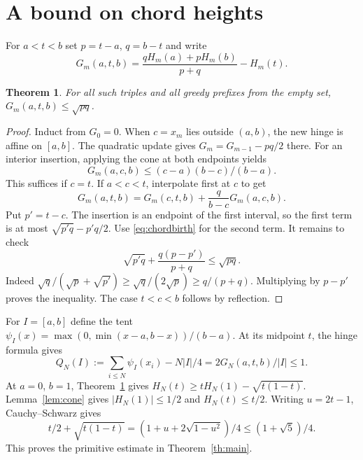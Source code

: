 \documentclass[11pt,a4paper]{amsart}
\newtheorem{theorem}{Theorem}[section]
\begin{document}
\section{A bound on chord heights}\label{sec:chord}
For $a<t<b$ set $p=t-a$, $q=b-t$ and write
\[
 G_m(a,t,b)=\frac{qH_m(a)+pH_m(b)}{p+q}-H_m(t).
\]
\begin{theorem}\label{th:chord}
For all such triples and all greedy prefixes from the empty set,
$G_m(a,t,b)\le\sqrt{pq}$.
\end{theorem}
\begin{proof}
Induct from $G_0=0$. When $c=x_m$ lies outside $(a,b)$, the new hinge
is affine on $[a,b]$. The quadratic update gives
$G_m=G_{m-1}-pq/2$ there. For an interior insertion, applying the cone
at both endpoints yields
\begin{equation}\label{eq:chordbirth}
 G_m(a,c,b)\le (c-a)(b-c)/(b-a).
\end{equation}
This suffices if $c=t$. If $a<c<t$, interpolate first at $c$ to get
\[
 G_m(a,t,b)=G_m(c,t,b)+\frac{q}{b-c}G_m(a,c,b).
\]
Put $p'=t-c$. The insertion is an endpoint of the first interval, so
the first term is at most $\sqrt{p'q}-p'q/2$. Use
\eqref{eq:chordbirth} for the second term. It remains to check
\[
 \sqrt{p'q}+\frac{q(p-p')}{p+q}\le\sqrt{pq}.
\]
Indeed $\sqrt q/(\sqrt p+\sqrt{p'})\ge \sqrt q/(2\sqrt p)
\ge q/(p+q)$. Multiplying by $p-p'$ proves the inequality.
The case $t<c<b$ follows by reflection.
\end{proof}

For $I=[a,b]$ define the tent
$\psi_I(x)=\max(0,\min(x-a,b-x))/(b-a)$. At its midpoint $t$,
the hinge formula gives
\[
 Q_N(I):=\sum_{i\le N}\psi_I(x_i)-N|I|/4
       =2G_N(a,t,b)/|I|\le1 .
\]
At $a=0$, $b=1$, Theorem~\ref{th:chord} gives
$H_N(t)\ge tH_N(1)-\sqrt{t(1-t)}$.
Lemma~\ref{lem:cone} gives $|H_N(1)|\le1/2$ and $H_N(t)\le t/2$.
Writing $u=2t-1$, Cauchy--Schwarz gives
\[
 t/2+\sqrt{t(1-t)}=(1+u+2\sqrt{1-u^2})/4\le(1+\sqrt5)/4 .
\]
This proves the primitive estimate in Theorem~\ref{th:main}.
\end{document}
